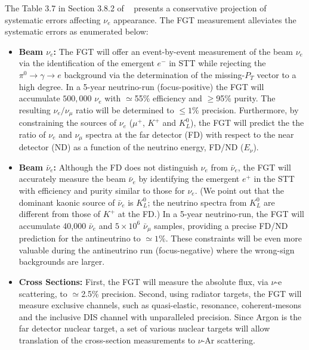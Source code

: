 The Table 3.7 
in Section 3.8.2 of \volphys\
presents a conservative projection of systematic errors affecting
$\nu_e$ appearance. The FGT measurement alleviates the systematic
errors as enumerated below:
\begin{itemize}
    \item {\bf Beam $\nu_e$:} The FGT will offer an event-by-event
      measurement of the beam $\nu_e$ via the identification of the
      emergent $e^-$ in STT while rejecting the $\pi^0 \rightarrow
      \gamma \rightarrow e$ background via the determination of the
      missing-$P_T$ vector to a high degree.  In a 5-year neutrino-run
      (focus-positive) the FGT will accumulate $500,000$ $\nu_e$
      with $\simeq$55\% efficiency and $\geq$95\% purity.
      The resulting $\nu_e / \nu_\mu$ ratio will be determined to
      $\leq 1\%$ precision. Furthermore, by constraining the sources
      of $\nu_e$ ($\mu^+$, $K^+$ and $K^0_L$), the FGT will predict
      the the ratio of $\nu_e$ and $\nu_\mu$ spectra at the far
      detector (FD) with respect to the near detector (ND) as a
      function of the neutrino energy, FD/ND ($E_\nu$).

    \item {\bf Beam $\bar\nu_e$:} Although the FD does not distinguish
      $\nu_e$ from $\bar\nu_e$, the FGT will accurately measure the
      beam $\bar\nu_e$ by identifying the emergent $e^+$ in the STT
      with efficiency and purity similar to those for $\nu_e$.  (We
      point out that the dominant kaonic source of $\bar\nu_e$ is
      $K^0_L$; the neutrino spectra from $K^0_L$ are different from
      those of $K^+$ at the FD.)  In a 5-year neutrino-run, the FGT
      will accumulate 40,000 $\bar\nu_e$ and $5\times 10^6$
      $\bar\nu_\mu$ samples, providing a precise FD/ND prediction for
      the antineutrino to $\simeq 1\%$.  These constraints will be
      even more valuable during the antineutrino run (focus-negative)
      where the wrong-sign backgrounds are larger.

    \item {\bf Cross Sections:} First, the FGT will 
      measure the absolute flux, via $\nu$-e scattering,
      to $\simeq$2.5\% precision. Second, using radiator targets,
      the FGT will measure exclusive channels, such as
      quasi-elastic, resonance, coherent-mesons and the inclusive DIS
      channel with unparalleled precision. Since Argon is the
      far detector nuclear target, a set of various nuclear targets will
      allow translation of the cross-section measurements to $\nu$-Ar
      scattering.


\end{itemize}
